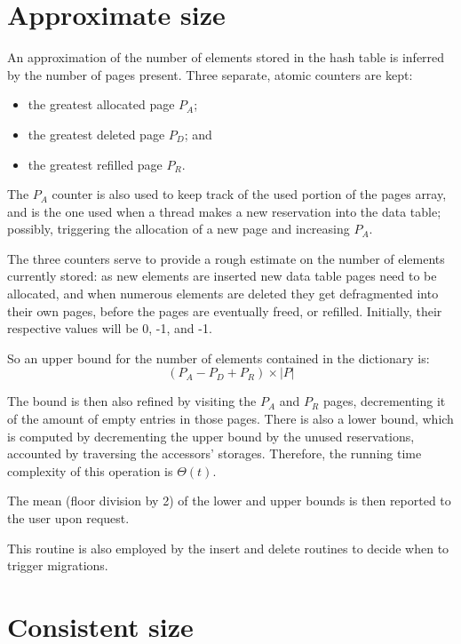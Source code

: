 \section{Approximate size}\label{sec:approximate-size}

An approximation of the number of elements stored in the hash table is inferred by the number of pages present.
Three separate, atomic counters are kept:

\begin{itemize}
    \item the greatest allocated page $P_A$;
    \item the greatest deleted page $P_D$; and
    \item the greatest refilled page $P_R$.
\end{itemize}

The $P_A$ counter is also used to keep track of the used portion of the pages array, and is the one used when a thread makes a new reservation into the data table; possibly, triggering the allocation of a new page and increasing $P_A$.

The three counters serve to provide a rough estimate on the number of elements currently stored: as new elements are inserted new data table pages need to be allocated, and when numerous elements are deleted they get defragmented into their own pages, before the pages are eventually freed, or refilled.
Initially, their respective values will be 0, -1, and -1.

So an upper bound for the number of elements contained in the dictionary is:
\[
    (P_A - P_D + P_R) \times |P|
\]

The bound is then also refined by visiting the $P_A$ and $P_R$ pages, decrementing it of the amount of empty entries in those pages.
There is also a lower bound, which is computed by decrementing the upper bound by the unused reservations, accounted by traversing the accessors' storages.
Therefore, the running time complexity of this operation is $\Theta(t)$.

The mean (floor division by 2) of the lower and upper bounds is then reported to the user upon request.

This routine is also employed by the insert and delete routines to decide when to trigger migrations.


\section{Consistent size}\label{sec:consistent-size}

